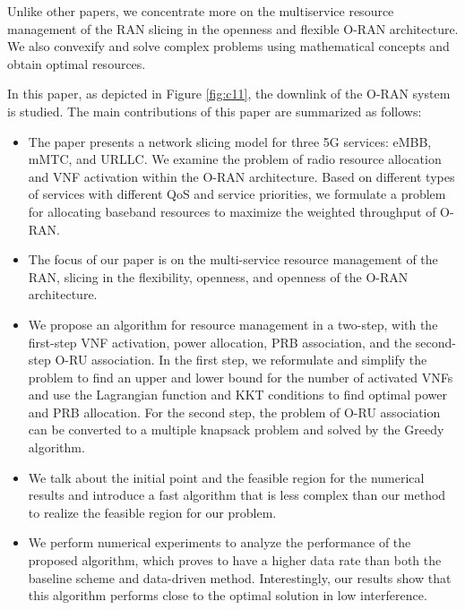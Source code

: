\documentclass[12pt, letterpaper]{article}
\begin{document}
Unlike other papers, we concentrate more on the multiservice resource management of the RAN slicing in the openness and flexible O-RAN architecture. We also convexify and solve complex problems using mathematical concepts and obtain optimal resources.

In this paper, as depicted in Figure \ref{fig:c11}, the downlink of the O-RAN system is studied. The main contributions of this paper are summarized as follows:
\begin{itemize}
\item The paper presents a network slicing model for three 5G services: eMBB, mMTC, and URLLC. We examine the problem of radio resource allocation and VNF activation within the O-RAN architecture.
Based on different types of services with different QoS and service priorities, we formulate a problem for allocating baseband resources to maximize the weighted throughput of O-RAN.
\item The focus of our paper is on the multi-service resource management of the RAN, slicing in the flexibility, openness, and openness of the O-RAN architecture.
\item We propose an algorithm for resource management in a two-step, with the first-step VNF activation, power allocation, PRB association, and the second-step O-RU association.
In the first step, we reformulate and simplify the problem to find an upper and lower bound for the number of activated VNFs and use the Lagrangian function and KKT conditions to find optimal power and PRB allocation. For the second step, the problem of O-RU association can be converted to a multiple knapsack problem and solved by the Greedy algorithm.
\item We talk about the initial point and the feasible region for the numerical results and introduce a fast algorithm that is less complex than our method to realize the feasible region for our problem.
\item We perform numerical experiments to analyze the performance of the proposed algorithm, which proves to have a higher data rate than both the baseline scheme and data-driven method. Interestingly, our results show that this algorithm performs close to the optimal solution in low interference.
\end{itemize}
\end{document}
